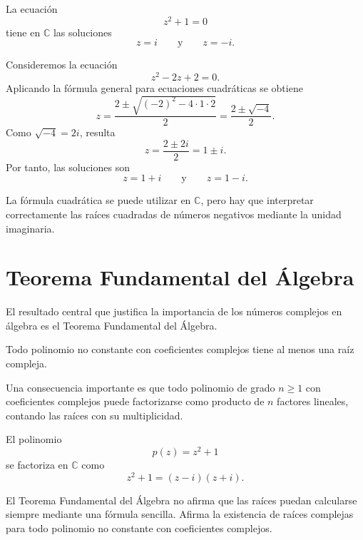 \begin{ejemplo}
La ecuación
\[
  z^2+1=0
\]
tiene en \(\mathbb{C}\) las soluciones
\[
  z=i
  \qquad \text{y} \qquad
  z=-i.
\]
\end{ejemplo}

\begin{ejemplo}
Consideremos la ecuación
\[
  z^2-2z+2=0.
\]
Aplicando la fórmula general para ecuaciones cuadráticas se obtiene
\[
  z=\frac{2\pm\sqrt{(-2)^2-4\cdot 1\cdot 2}}{2}
  =\frac{2\pm\sqrt{-4}}{2}.
\]
Como \(\sqrt{-4}=2i\), resulta
\[
  z=\frac{2\pm 2i}{2}=1\pm i.
\]
Por tanto, las soluciones son
\[
  z=1+i
  \qquad \text{y} \qquad
  z=1-i.
\]
\end{ejemplo}

\begin{advertencia}
La fórmula cuadrática se puede utilizar en \(\mathbb{C}\), pero hay que interpretar correctamente las raíces cuadradas de números negativos mediante la unidad imaginaria.
\end{advertencia}

\section{Teorema Fundamental del Álgebra}

El resultado central que justifica la importancia de los números complejos en álgebra es el Teorema Fundamental del Álgebra.

\begin{teorema}
Todo polinomio no constante con coeficientes complejos tiene al menos una raíz compleja.
\end{teorema}

Una consecuencia importante es que todo polinomio de grado \(n\geq 1\) con coeficientes complejos puede factorizarse como producto de \(n\) factores lineales, contando las raíces con su multiplicidad.

\begin{ejemplo}
El polinomio
\[
  p(z)=z^2+1
\]
se factoriza en \(\mathbb{C}\) como
\[
  z^2+1=(z-i)(z+i).
\]
\end{ejemplo}

\begin{advertencia}
El Teorema Fundamental del Álgebra no afirma que las raíces puedan calcularse siempre mediante una fórmula sencilla. Afirma la existencia de raíces complejas para todo polinomio no constante con coeficientes complejos.
\end{advertencia}

